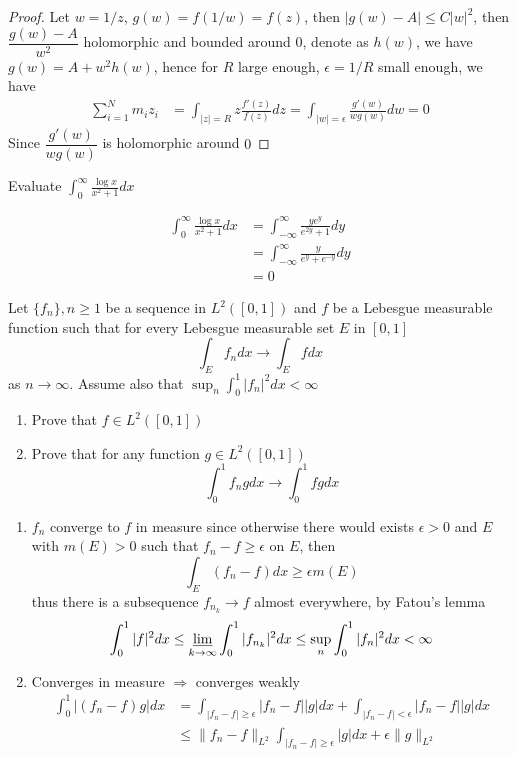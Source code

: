 \documentclass[main]{subfiles}
\begin{document}
\begin{proof}
Let $w=1/z$, $g(w)=f(1/w)=f(z)$, then $|g(w)-A|\leq C|w|^2$, then $\dfrac{g(w)-A}{w^2}$ holomorphic and bounded around $0$, denote as $h(w)$, we have $g(w)=A+w^2h(w)$, hence for $R$ large enough, $\epsilon=1/R$ small enough, we have
\begin{align*}
\sum_{i=1}^Nm_iz_i&=\int_{|z|=R}z\frac{f'(z)}{f(z)}dz=\int_{|w|=\epsilon}\frac{g'(w)}{wg(w)}dw=0
\end{align*}
Since $\dfrac{g'(w)}{wg(w)}$ is holomorphic around $0$
\end{proof}

\begin{exercise}
Evaluate $\displaystyle\int_{0}^\infty\frac{\log x}{x^2+1}dx$
\end{exercise}

\begin{solution}
\begin{align*}
\int_{0}^\infty\frac{\log x}{x^2+1}dx&=\int_{-\infty}^\infty\frac{ye^y}{e^{2y}+1}dy \\
&=\int_{-\infty}^\infty\frac{y}{e^{y}+e^{-y}}dy \\
&=0
\end{align*}
\end{solution}

\begin{exercise}
Let $\{f_n\},n\geq1$ be a sequence in $L^2([0, 1])$ and $f$ be a Lebesgue measurable function such that for every Lebesgue measurable set $E$ in $[0, 1]$
\[\int_Ef_ndx\to\int_Efdx\]
as $n \to\infty$. Assume also that $\displaystyle\sup_n\int_0^1|f_n|^2dx<\infty$
\begin{enumerate}[leftmargin=*]
\item Prove that $f\in L^2([0,1])$
\item Prove that for any function $g\in L^2([0,1])$
\[\int_0^1f_ngdx\to\int_0^1fgdx\]
\end{enumerate}
\end{exercise}

\begin{solution}
\begin{enumerate}[leftmargin=*]
\item $f_n$ converge to $f$ in measure since otherwise there would exists $\epsilon>0$ and $E$ with $m(E)>0$ such that $f_n-f\geq\epsilon$ on $E$, then
\[\int_E(f_n-f)dx\geq\epsilon m(E)\]
thus there is a subsequence $f_{n_k}\to f$ almost everywhere, by Fatou's lemma
\[\int_0^1 |f|^2dx\leq\varliminf_{k\to\infty}\int_0^1|f_{n_k}|^2dx\leq\sup_{n}\int_0^1|f_{n}|^2dx<\infty\]
\item Converges in measure $\Rightarrow$ converges weakly
\begin{align*}
\int_0^1|(f_n-f)g|dx&=\int_{|f_n-f|\geq\epsilon}|f_n-f||g|dx+\int_{|f_n-f|<\epsilon}|f_n-f||g|dx \\
&\leq\|f_n-f\|_{L^2}\int_{|f_n-f|\geq\epsilon}|g|dx+\epsilon\|g\|_{L^2}
\end{align*}
\end{enumerate}
\end{solution}
\end{document}
